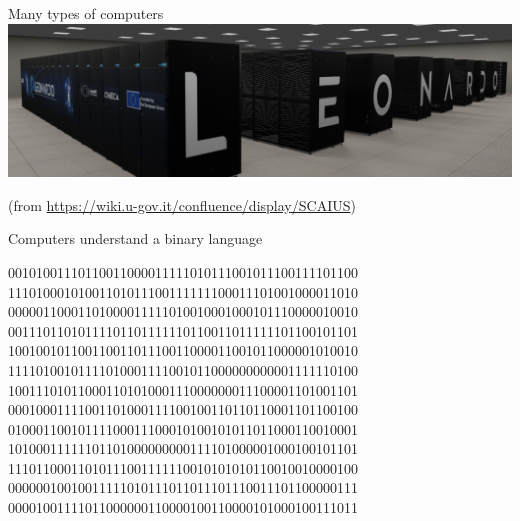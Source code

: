 \begin{frame}{Many types of computers \insertcontinuationtext}
  \includegraphics[width=\textwidth]{images/leonardo.png}

  {\tiny (from \url{https://wiki.u-gov.it/confluence/display/SCAIUS})}
\end{frame}

\begin{frame}[fragile]{Computers understand a binary language}

\begin{semiverbatim}
{\color{gray}00101001110110011000011111010111001011100111101100
11101000101001101011100111111100011101001000011010
00000110001101000011111010010001000101110000010010
00111011010111101101111110110011011111101100101101
10010010110011001101110011000011001011000001010010
11110100101111010001111001011000000000001111110100
10011101011000110101000111000000011100001101001101
00010001111001101000111100100110110110001101100100
01000110010111100011100010100101011011000110010001
10100011111101101000000000111101000001000100101101
11101100011010111001111110010101010110010010000100
00000010010011111010111011011101110011101100000111
00001001111011000000110000100110000101000100111011}\end{semiverbatim}


\end{frame}

